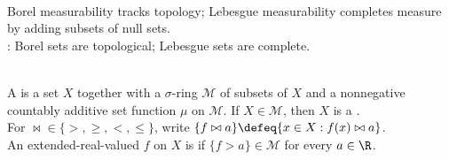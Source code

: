 \begin{perspective} \label{per:borel-lebesgue-tradeoff} \\
Borel measurability tracks topology; Lebesgue measurability completes measure by adding subsets of null sets.\\
: Borel sets are topological; Lebesgue sets are complete.
\end{perspective}

\begin{definition} \label{def:measure-space-and-measurable-functions} \\
A  is a set $X$ together with a $\sigma$-ring $\mathcal{M}$ of subsets of $X$ and a nonnegative countably additive set function $\mu$ on $\mathcal{M}$. If $X\in\mathcal{M}$, then $X$ is a .\\
For $\bowtie\in\{>,\geq,<,\leq\}$, write $\{f\bowtie a\}\defeq\{x\in X:f(x)\bowtie a\}$.\\
An extended-real-valued $f$ on $X$ is  if $\{f>a\}\in\mathcal{M}$ for every $a\in\R$.
\end{definition}

